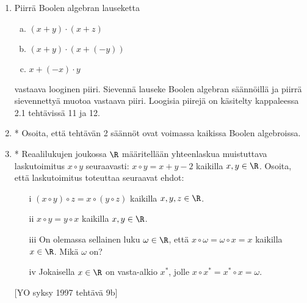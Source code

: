 \begin{enumerate}
\item
Piirrä Boolen algebran lauseketta
\begin{enumerate}[a)]
\item $(x + y) \cdot (x + z)$
\item $(x + y) \cdot (x + (-y))$
\item $x + (-x) \cdot y$
\end{enumerate}
vastaava looginen piiri. Sievennä lauseke Boolen algebran säännöillä ja piirrä sievennettyä muotoa vastaava piiri. Loogisia piirejä on käsitelty kappaleessa 2.1 tehtävissä 11 ja 12.

\item
* Osoita, että tehtävän 2 säännöt ovat voimassa kaikissa Boolen algebroissa.

\item
* Reaalilukujen joukossa $\R$ määritellään yhteenlaskua muistuttava laskutoimitus $x \circ y$ seuraavasti: $x \circ y = x + y - 2$ kaikilla $x, y \in \R$. Osoita, että laskutoimitus toteuttaa seuraavat ehdot: 
\begin{itemize}
\item[i]
$(x \circ y) \circ z = x \circ (y \circ z)$ kaikilla $x, y, z \in \R$. 
\item[ii]
$x \circ y = y \circ x$ kaikilla $x, y \in \R$. 
\item[iii]
On olemassa sellainen luku $\omega \in \R$, että $x \circ \omega = \omega \circ x = x$ kaikilla $x \in \R$. Mikä $\omega$ on? 
\item[iv]
Jokaisella $x \in \R$ on vasta-alkio $x^*$, jolle $x \circ x^* = x^* \circ x = \omega$. 
\end{itemize}
[YO syksy 1997 tehtävä 9b]

\end{enumerate}

